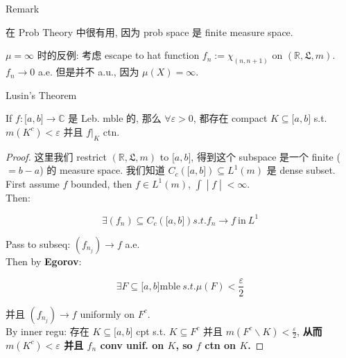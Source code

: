 \documentclass{qlnotes-export}
\begin{document}
\begin{qlremark}{Remark}

在 Prob Theory 中很有用, 因为 prob space 是 finite measure space.

\end{qlremark}

\begin{example}\label{ex-05-integration-of-real-and-complex-functions-example-005}

\(\mu = \infty\) 时的反例: 考虑 escape to hat function \(f_{n} := \chi_{(n,n + 1)}\) on \(({\mathbb{R}},{\mathfrak{L}},m)\).\\
\(f_{n}\rightarrow 0\) a.e. 但是并不 a.u., 因为 \(\mu(X) = \infty\).

\end{example}

\begin{theorem}{Lusin's Theorem}\label{thm-05-integration-of-real-and-complex-functions-lusin-s-theorem}

If \(f:\lbrack a,b\rbrack\rightarrow{\mathbb{C}}\) 是 Leb. mble 的, 那么 \(\forall\varepsilon > 0\), 都存在 compact \(K \subseteq \lbrack a,b\rbrack\) s.t. \(m(K^{c}) < \varepsilon\) 并且 \(f|_{K}\) ctn.

\end{theorem}

\begin{proof}

这里我们 restrict \(({\mathbb{R}},{\mathfrak{L}},m)\) to \(\lbrack a,b\rbrack\), 得到这个 subspace 是一个 finite (\(= b - a\)) 的 measure space. 我们知道 \(C_{c}(\lbrack a,b\rbrack) \subseteq L^{1}(m)\) 是 dense subset.\\
First assume \(f\) bounded, then \(f \in L^{1}(m)\), \(\left. \int \middle| f \middle| < \infty \right.\).\\
Then:

\[\exists(f_{n}) \subseteq C_{c}(\lbrack a,b\rbrack) s.t. f_{n}\rightarrow f\ \text{in}\ L^{1}\]

Pass to subseq: \((f_{n_{j}})\rightarrow f\) a.e.\\
Then by \textbf{Egorov}:

\[\exists F \subseteq \lbrack a,b\rbrack\text{mble}\ s.t.\mu(F) < \frac{\varepsilon}{2}\]

并且 \((f_{n_{j}})\rightarrow f\) uniformly on \(F^{c}\).\\
By inner regu: 存在 \(K \subseteq \lbrack a,b\rbrack\) cpt s.t. \(K \subseteq F^{c}\) 并且 \(m(F^{c}\backslash K) < \frac{\varepsilon}{2}\), \textbf{从而 \(m(K^{c}) < \varepsilon\) 并且 \(f_{n}\) conv unif. on \(K\), so \(f\) ctn on \(K\).}

\end{proof}
\end{document}
